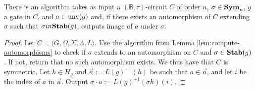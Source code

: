 \documentclass[../paper.tex]{subfiles}
\begin{document}
\begin{cor}
  There is an algorithm takes as input a $(\mathbb{B}, \tau)$-circuit $C$ of
  order $n$, $\sigma \in \text{\textbf{Sym}}_n$, $g$ a gate in $C$, and $a \in \text{unv}(g)$
  and, if there exists an automorphism of $C$ extending $\sigma$ such that
  $\sigma in \text{\textbf{Stab}}(g)$, outputs image of $a$ under $\sigma$.
  \label{cor:compute-automorphisms-labels}
\end{cor}
\begin{proof}
  Let $C = \langle G, \Omega, \Sigma, \Lambda, L \rangle$. Use the algorithm
  from Lemma \ref{lem:compute-automorphisms} to check if $\sigma$ extends to an
  automorphism on $C$ and $\sigma \in \text{\textbf{Stab}}(g)$. If not, return that no such
  automorphism exists. We thus have that $C$ is symmetric. Let $h \in H_g$ and
  $\vec{a} := L(g)^{-1}(h)$ be such that $a \in \vec{a}$, and let $i$ be the
  index of $a$ in $\vec{a}$. Output $\sigma \cdot a := L(g)^{-1}(\sigma h)(i)$.
\end{proof}


\end{document}
